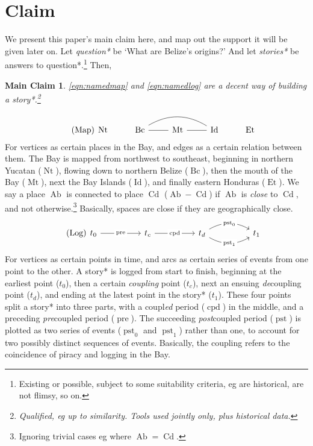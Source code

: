 \documentclass{amsart}
\newcommand{\ment}[1]{\textit{#1}} %
\DeclareMathOperator{\ab}{Ab} %
\DeclareMathOperator{\cd}{Cd} %
\DeclareMathOperator{\id}{Id} %
\DeclareMathOperator{\mt}{Mt} %
\DeclareMathOperator{\bc}{Bc} %
\DeclareMathOperator{\et}{Et} %
\DeclareMathOperator{\nt}{Nt} %
\DeclareMathOperator{\pre}{pre} %
\DeclareMathOperator{\pst}{pst} %
\DeclareMathOperator{\cpd}{cpd} %
\newtheorem{mainclm}{Main Claim} %
\theoremstyle{definition}
\theoremstyle{remark}
\begin{document}
\section{Claim}
\label{s:claim}
	We present this paper's main claim here, and map out the support it will be given later on. Let \ment{question*} be `What are Belize's origins?' And let \ment{stories*} be answers to question*.\footnote{Existing or possible, subject to some suitability criteria, eg are historical, are not flimsy, so on.} Then,
	\begin{mainclm}
	\label{clm:maindecency}
	\ref{eqn:namedmap} and \ref{eqn:namedlog} are a decent way of building a story*.\footnote{Qualified, eg up to similarity. Tools used jointly only, plus historical data.}
	\end{mainclm}
	\begin{equation}
	\tag{Map}
	\label{eqn:namedmap}
		\begin{tikzcd}[arrows=dash]
		\nt &\bc \rar \ar[rr,bend left] &\mt \rar &\id &\et
		\end{tikzcd}
	\end{equation}
	For vertices as certain places in the Bay, and edges as a certain relation between them. The Bay is mapped from northwest to southeast, beginning in northern Yucatan (\(\nt\)), flowing down to northern Belize (\(\bc\)), then the mouth of the Bay (\(\mt\)), next the Bay Islands (\(\id\)), and finally eastern Honduras (\(\et\)). We say a place \(\ab\) is connected to place \(\cd\) (\(\ab-\cd\)) if \(\ab\) is \ment{close} to \(\cd\), and not otherwise.\footnote{Ignoring trivial cases eg where \(\ab=\cd\).} Basically, spaces are close if they are geographically close.
	\begin{equation}
	\tag{Log}
	\label{eqn:namedlog}
		\begin{tikzcd}[sep=huge]
		t_0 \rar["\pre" description] &t_c \rar["\cpd" description] &t_d \rar[bend left,"\pst_0" description] \rar[bend right,"\pst_1" description] &t_1
		\end{tikzcd}
	\end{equation}
	For vertices as certain points in time, and arcs as certain series of events from one point to the other. A story* is logged from start to finish, beginning at the earliest point (\(t_0\)), then a certain \ment{coupling} point (\(t_c\)), next an ensuing \ment{de}coupling point (\(t_d\)), and ending at the latest point in the story* (\(t_1\)). These four points split a story* into three parts, with a coupl\ment{ed} period (\(\cpd\)) in the middle, and a preceding \ment{pre}coupled period (\(\pre\)). The succeeding \ment{post}coupled period (\(\pst\)) is plotted as two series of events (\(\pst_0\) and \(\pst_1\)) rather than one, to account for two possibly distinct sequences of events. Basically, the coupling refers to the coincidence of piracy and logging in the Bay.
	
\end{document}
